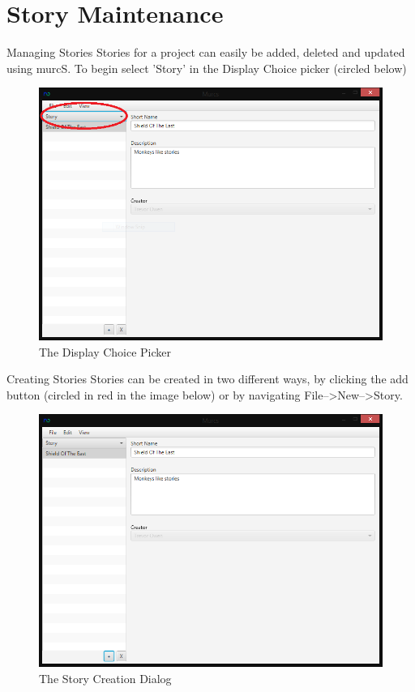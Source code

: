 \section{Story Maintenance}

Managing Stories
\newline
Stories for a project can easily be added, deleted and updated using murcS. To begin select 'Story' in the Display Choice picker (circled below)

\begin{figure}[H]
\centering
\includegraphics[width=\textwidth]{images/screenshots/stories1.PNG}
\caption{The Display Choice Picker}
\label{fig:new_project}
\end{figure}

Creating Stories
Stories can be created in two different ways, by clicking the add button (circled in red in the image below) or by navigating File-->New-->Story.

\begin{figure}[H]
\centering
\includegraphics[width=\textwidth]{images/screenshots/stories2.PNG}
\caption{The Story Creation Dialog}
\label{fig:new_project}
\end{figure}

